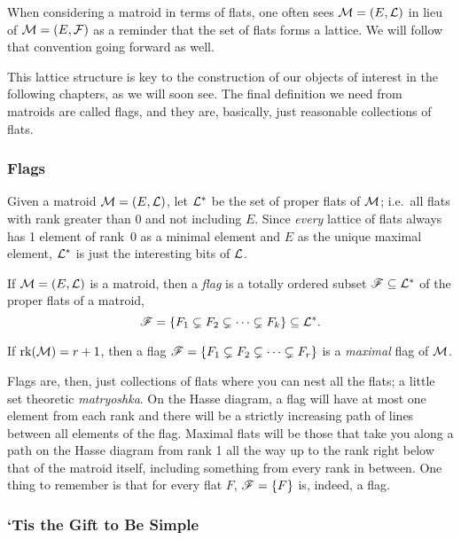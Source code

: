 \documentclass[12pt,oneside]{../../sfsuthesis}
\begin{document}
When considering a matroid in terms of flats, one often sees \( \mathcal{M} = (E, \mathcal{L}) \) in lieu of \( \mathcal{M} = (E, \mathcal{F}) \) as a reminder that the set of flats forms a lattice.
We will follow that convention going forward as well.

This lattice structure is key to the construction of our objects of interest in the following chapters, as we will soon see.
The final definition we need from matroids are called flags, and they are, basically, just reasonable collections of flats.

\subsubsection{Flags}

Given a matroid \( \mathcal{M} = (E, \mathcal{L}) \), let \( \mathcal{L}^\ast \) be the set of proper flats of \( \mathcal{M} \);
i.e.\ all flats with rank greater than 0 and not including \( E \).
Since \textit{every} lattice of flats always has 1 element of rank~0 as a minimal element and \( E \) as the unique maximal element, \( \mathcal{L}^\ast \) is just the interesting bits of \( \mathcal{L} \).

\begin{definition}[Flag]\label{def:flag}

    If \( \mathcal{M} = (E, \mathcal{L}) \) is a matroid, then a \emph{flag} is a totally ordered subset \( \mathscr{F} \subseteq \mathcal{L}^\ast \) of the proper flats of a matroid,
    \[
        \mathscr{F} = \{ F_1 \subsetneq F_2 \subsetneq \cdots \subsetneq F_k \} \subseteq \mathcal{L}^\ast.
    \]

    If \( \operatorname{rk}(\mathcal{M}) = r + 1 \), then a flag \( \mathscr{F} = \{ F_1 \subsetneq F_2 \subsetneq \cdots \subsetneq F_r \} \) is a \emph{maximal} flag of \( \mathcal{M} \).

\end{definition}

Flags are, then, just collections of flats where you can nest all the flats; a little set theoretic \textit{matryoshka}.
On the Hasse diagram, a flag will have at most one element from each rank and there will be a strictly increasing path of lines between all elements of the flag.
Maximal flats will be those that take you along a path on the Hasse diagram from rank 1 all the way up to the rank right below that of the matroid itself, including something from every rank in between.
One thing to remember is that for every flat \( F \), \( \mathscr{F} = \{ F \} \) is, indeed, a flag.

\subsubsection{`Tis the Gift to Be Simple}
\end{document}
